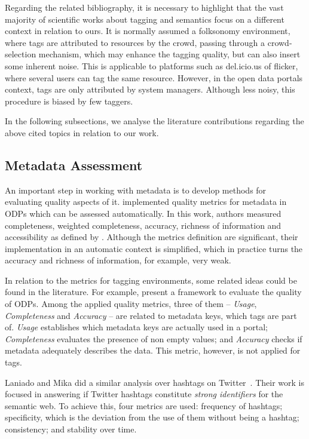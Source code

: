 Regarding the related bibliography, it is necessary to highlight that the vast majority of scientific works about tagging and semantics focus on a different context in relation to ours.
It is normally assumed a folksonomy environment, where tags are attributed to resources by the crowd, passing through a crowd-selection mechanism, which may enhance the tagging quality, but can also insert some inherent noise.
This is applicable to platforms such as del.icio.us of flicker, where several users can tag the same resource.
However, in the open data portals context, tags are only attributed by system managers.
Although less noisy, this procedure is biased by few taggers.

In the following subsections, we analyse the literature contributions regarding the above cited topics in relation to our work.

\subsection{Metadata Assessment}
\label{sec:metadata_assessment}

An important step in working with metadata is to develop methods for evaluating quality aspects of it.
 implemented quality metrics for metadata in ODPs which can be assessed automatically.
In this work, authors measured completeness, weighted completeness, accuracy, richness of information and accessibility as defined by .
Although the metrics definition are significant, their implementation in an automatic context is simplified, which in practice turns the accuracy and richness of information, for example, very weak.

In relation to the metrics for tagging environments, some related ideas could be found in the literature.
For example,  present a framework to evaluate the quality of ODPs. 
Among the applied quality metrics, three of them -- \emph{Usage}, \emph{Completeness} and \emph{Accuracy} -- are related to metadata keys, which tags are part of. 
\emph{Usage} establishes which metadata keys are actually used in a portal; \emph{Completeness} evaluates the presence of non empty values; and \emph{Accuracy} checks if metadata adequately describes the data.
This metric, however, is not applied for tags.

Laniado and Mika did a similar analysis over hashtags on Twitter~\cite{Laniado2010}.
Their work is focused in answering if Twitter hashtags constitute \emph{strong identifiers} for the semantic web. 
To achieve this, four metrics are used: frequency of hashtags; specificity, which is the deviation from the use of them without being a hashtag; consistency; and stability over time.

